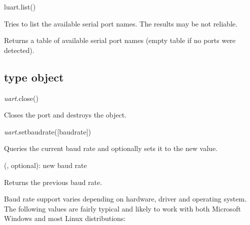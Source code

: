 \documentclass[a4paper,12pt,twoside,extrafontsizes]{memoir}
\begin{document}

\begin{luafuncprototype}
luart.list()
\end{luafuncprototype}

\begin{funcdescr}
	Tries to list the available serial port names. The results may be not reliable.
\end{funcdescr}

\begin{funcret}
	Returns a table of available serial port names (empty table if no ports were detected).
\end{funcret}

\subsection{ type object}


\begin{luafuncprototype}
\emph{uart}.close()
\end{luafuncprototype}

\begin{funcdescr}
	Closes the port and destroys the object.
\end{funcdescr}


\begin{luafuncprototype}
\emph{uart}.setbaudrate([baudrate])
\end{luafuncprototype}

\begin{funcdescr}
	Queries the current baud rate and optionally sets it to the new value.
\end{funcdescr}

\begin{funcparams}
	 (, optional): new baud rate
\end{funcparams}

\begin{funcret}
	Returns the previous baud rate.
\end{funcret}

\begin{funcremarks}
	Baud rate support varies depending on hardware, driver and operating system. The following values are fairly typical and likely to work with both Microsoft Windows and most Linux distributions:
	
	\vspace{0.5\onelineskip}
\end{funcremarks}
\end{document}
